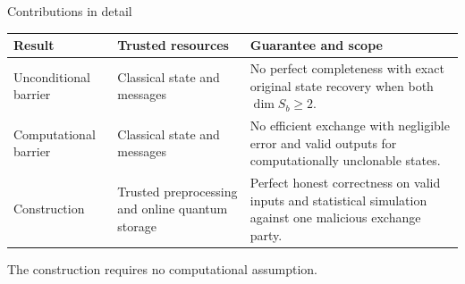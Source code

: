 \documentclass[aspectratio=169,11pt]{beamer}
\begin{document}
\begin{frame}{Contributions in detail}

\footnotesize
\setlength{\parskip}{0pt}
\setlength{\tabcolsep}{5pt}
\renewcommand{\arraystretch}{1.20}

\noindent
\begin{tabularx}{\linewidth}{@{}
    >{\raggedright\arraybackslash}p{2.65cm}
    >{\raggedright\arraybackslash}p{3.55cm}
    >{\raggedright\arraybackslash}X
@{}}

\toprule
\textbf{Result}
&
\textbf{Trusted resources}
&
\textbf{Guarantee and scope}
\\
\midrule

Unconditional barrier
&
Classical state and messages
&
No perfect completeness with exact original state recovery
when both $\dim S_b\geq 2$.
\\

Computational barrier
&
Classical state and messages
&
No efficient exchange with negligible error and valid outputs
for computationally unclonable states.
\\

Construction
&
Trusted preprocessing and online quantum storage
&
Perfect honest correctness on valid inputs and statistical
simulation against one malicious exchange party.
\\

\bottomrule
\end{tabularx}


\smallskip

The construction requires no computational assumption.


\end{frame}
\end{document}
